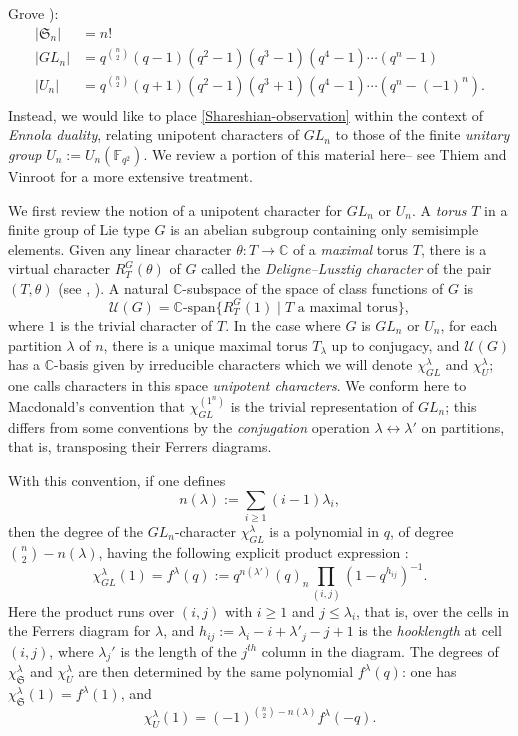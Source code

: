 \documentclass[10pt]{amsart}
\theoremstyle{plain}
\theoremstyle{definition}
\theoremstyle{remark}
\numberwithin{equation}{section}
\newcommand\FF{\mathbb{F}}
\newcommand\CC{\mathbb{C}}
\newcommand\symm{\mathfrak{S}}
\begin{document}
Grove \cite[Chapters 1, 10, 11]{Grove}):
$$
\begin{aligned}
|\symm_n|&=n!\\
|GL_n|&=q^{\binom{n}{2}} (q-1)(q^2-1)(q^3-1)(q^4-1)\cdots (q^n-1)\\
|U_n|&=q^{\binom{n}{2}} (q+1)(q^2-1)(q^3+1)(q^4-1)\cdots (q^n-(-1)^n).\\
\end{aligned}
$$
Instead, we would like to place \eqref{Shareshian-observation} within
the context of {\it Ennola duality}, relating
unipotent characters of $GL_n$ to those
of the finite {\it unitary group} $U_n:=U_n(\FF_{q^2})$.
We review a portion of this material here--
see Thiem and Vinroot \cite{ThiemVinroot} for a more extensive treatment.

We first review the notion of a unipotent character for $GL_n$ or
$U_n$.  A {\it torus} $T$ in a finite group of Lie type $G$
is an abelian subgroup containing only semisimple elements.  
Given any linear character $\theta:T\rightarrow \CC$
of a {\it maximal} torus $T$, 
there is a virtual character $R_T^G(\theta)$ of $G$ called 
the \emph{Deligne--Lusztig character} of the pair $(T,\theta)$ 
(see \cite[Chapter 11]{DigneMichel}, \cite[Chapter 7]{Carter}).  
A natural $\CC$-subspace of the space of class functions of $G$ is 
$$
\mathcal{U}(G)=\mathbb{\CC}\text{-span}\{R_T^G(1)\mid T\text{ a maximal torus}\},
$$
where $1$ is the trivial character of $T$.
In the case where $G$ is $GL_n$ or $U_n$, for each 
partition $\lambda$ of $n$, there is a unique maximal
torus $T_\lambda$ up to conjugacy, and $\mathcal{U}(G)$  
has a $\CC$-basis given by irreducible
characters which we will denote $\chi_{GL}^\lambda$ and  $\chi_U^\lambda$;
one calls characters in this space {\it unipotent characters}.
We conform here to Macdonald's convention \cite[Chap. IV]{Macdonald}
that $\chi_{GL}^{(1^n)}$ is the trivial representation of $GL_n$;
this differs from some conventions by the 
{\it conjugation} operation
$\lambda \leftrightarrow \lambda'$ on partitions, 
that is, transposing their Ferrers diagrams.

With this convention, if one defines
$$
n(\lambda):=\sum_{i \geq 1}(i-1)\lambda_i,
$$
then the degree of the $GL_n$-character $\chi_{GL}^\lambda$
is a polynomial in $q$, of degree $\binom{n}{2}-n(\lambda)$,
having the following explicit product expression \cite[Chap. IV, (6.7)]{Macdonald}:
\begin{equation}
\label{q-hook-formula}
\chi^\lambda_{GL}(1)=f^\lambda(q):=
q^{n(\lambda')}(q)_n \prod_{(i,j)} \left(1-q^{h_{ij}}\right)^{-1}.
\end{equation}
Here the product runs over $(i,j)$ with $i \geq 1$ and
$j \leq \lambda_i$, that is, over the cells in the Ferrers
diagram for $\lambda$, and $h_{ij}:=\lambda_i-i+\lambda'_j-j+1$ 
is the {\it hooklength} at cell $(i,j)$,
where $\lambda_j'$ is the length of the $j^{th}$ column 
in the diagram.  
The degrees of $\chi_\symm^\lambda$ and $\chi_U^\lambda$
are then determined by the same polynomial $f^\lambda(q)$:  
one has $\chi_\symm^\lambda(1)=f^\lambda(1)$, and 
\begin{equation}
\label{Ennola-duality}
\chi_U^\lambda(1) = (-1)^{\binom{n}{2}-n(\lambda)} f^\lambda(-q).
\end{equation}
\end{document}

